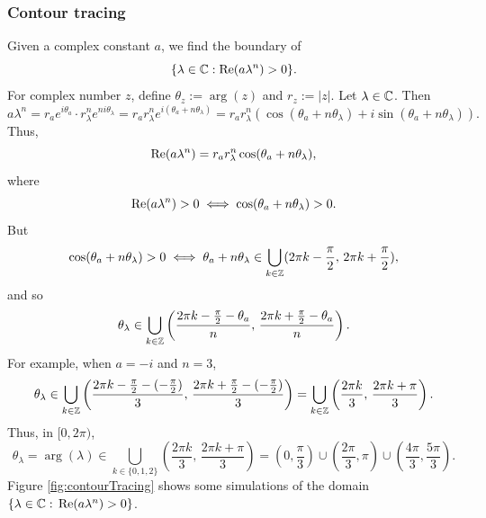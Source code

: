 \documentclass[11pt, oneside, a4paper]{article}
\begin{document}
\subsubsection{Contour tracing}
Given a complex constant $a$, we find the boundary of
\[\{\lambda\in\mathbb C: \mathrm{Re}(a\lambda^n)>0\}.\]
For complex number $z$, define $\theta_z:=\arg(z)$ and $r_z:=|z|$.
Let $\lambda\in\mathbb C$. Then
\[a\lambda^n = r_ae^{i\theta_a}\cdot r_\lambda^n e^{ni\theta_\lambda} = r_a r_\lambda^n e^{i(\theta_a+n\theta_\lambda)} = r_ar_\lambda^n(\cos(\theta_a+n\theta_\lambda) + i\sin(\theta_a+n\theta_\lambda)).\]
Thus,
\[\mathrm{Re}(a\lambda^n) = r_ar_\lambda^n \cos(\theta_a+n\theta_\lambda),\]
where
\[\mathrm{Re}(a\lambda^n)>0 \iff \cos(\theta_a+n\theta_\lambda)>0.\]
But
\[\cos(\theta_a+n\theta_\lambda)>0 \iff \theta_a+n\theta_\lambda\in \bigcup_{k\in\mathbb Z}(2\pi k -\frac{\pi}{2},\,2\pi k + \frac{\pi}{2}),\]
and so
\[\theta_\lambda\in \bigcup_{k\in\mathbb Z}\left(\frac{2\pi k -\frac{\pi}{2}-\theta_a}{n},\,\frac{2\pi k + \frac{\pi}{2}-\theta_a}{n}\right).\]
For example, when $a=-i$ and $n=3$,
\[\theta_\lambda\in \bigcup_{k\in\mathbb Z}\left(\frac{2\pi k -\frac{\pi}{2}-(-\frac{\pi}{2})}{3},\,\frac{2\pi k + \frac{\pi}{2}-(-\frac{\pi}{2})}{3}\right) = \bigcup_{k\in\mathbb Z}\left(\frac{2\pi k}{3},\,\frac{2\pi k + \pi}{3}\right).\]
Thus, in $[0,2\pi)$,
\[\theta_\lambda=\arg(\lambda)\in \bigcup_{k\in\{0,1,2\}}\left(\frac{2\pi k}{3},\,\frac{2\pi k + \pi}{3}\right) = (0,\frac{\pi}{3})\cup (\frac{2\pi}{3}, \pi)\cup (\frac{4\pi}{3}, \frac{5\pi}{3}).\]
Figure \ref{fig:contourTracing} shows some simulations of the domain $\{\lambda\in\mathbb C:\,\mathrm{Re}(a\lambda^n)>0\}$.
\end{document}
